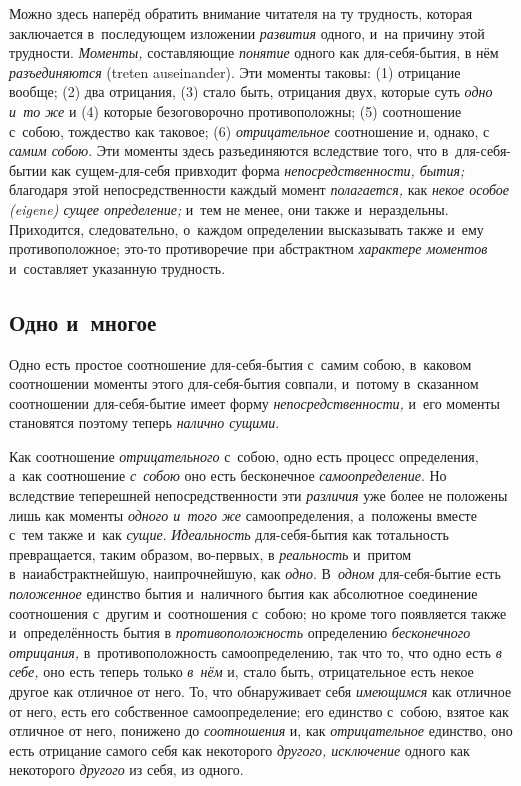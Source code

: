Можно здесь наперёд обратить внимание читателя на ту трудность, которая
заключается в~последующем изложении {\em развития}
одного, и~на причину этой трудности. {\em Моменты,}
составляющие {\em понятие} одного как для-себя-бытия, в
нём {\em разъединяются} (treten auseinander). Эти
моменты таковы: (1) отрицание вообще; (2) два отрицания, (3) стало быть,
отрицания двух, которые суть {\em одно и~то же} и (4)
которые безоговорочно противоположны; (5) соотношение с~собою, тождество
как таковое; (6) {\em отрицательное} соотношение и,
однако, с {\em самим собою}. Эти моменты здесь
разъединяются вследствие того, что в~для-себя-бытии как сущем-для-себя
привходит форма {\em непосредственности, бытия;}
благодаря этой непосредственности каждый
момент {\em полагается,} как
{\em некое особое (eigene) сущее определение;} и~тем не
менее, они также и~нераздельны. Приходится, следовательно, о~каждом
определении высказывать также и~ему противоположное; это-то противоречие
при абстрактном {\em характере моментов} и~составляет указанную трудность.

\subsection{Одно и~многое}

Одно есть простое соотношение для-себя-бытия с~самим собою, в~каковом
соотношении моменты этого для-себя-бытия совпали, и~потому в~сказанном
соотношении для-себя-бытие имеет форму
{\em непосредственности,} и~его моменты становятся
поэтому теперь {\em налично сущими}.

Как соотношение {\em отрицательного} с~собою, одно есть
процесс определения, а~как соотношение {\em с~собою}
оно есть бесконечное {\em самоопределение}. Но
вследствие теперешней непосредственности эти
{\em различия} уже более не положены лишь как моменты
{\em одного и~того же} самоопределения, а~положены
вместе с~тем также и~как {\em сущие}.
{\em Идеальность} для-себя-бытия как тотальность
превращается, таким образом, во-первых, в
{\em реальность} и~притом в~наиабстрактнейшую,
наипрочнейшую, как {\em одно}. В~{\em одном} для-себя-бытие есть
{\em положенное} единство бытия и~наличного бытия как
абсолютное соединение соотношения с~другим и~соотношения с~собою; но кроме
того появляется также и~определённость бытия в
{\em противоположность} определению
{\em бесконечного отрицания,} в~противоположность
самоопределению, так что то, что одно есть {\em в
себе,} оно есть теперь только {\em в~нём} и, стало
быть, отрицательное есть некое другое как отличное от него. То, что
обнаруживает себя {\em имеющимся} как отличное от него,
есть его собственное самоопределение; его единство с~собою, взятое как
отличное от него, понижено до {\em соотношения} и, как
{\em отрицательное} единство, оно есть отрицание самого
себя как некоторого {\em другого, исключение} одного как некоторого
{\em другого} из себя, из одного.

